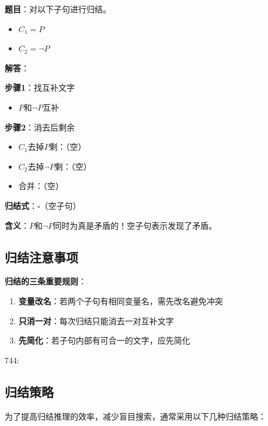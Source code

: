 \begin{examplebox}[例题3.11 归结得到空子句]
\textbf{题目}：对以下子句进行归结。
\begin{itemize}[itemsep=0pt]
    \item $C_1 = P$
    \item $C_2 = \neg P$
\end{itemize}
\tcblower
\textbf{解答}：

\textbf{步骤1}：找互补文字
\begin{itemize}[itemsep=0pt]
    \item $P$和$\neg P$互补
\end{itemize}

\textbf{步骤2}：消去后剩余
\begin{itemize}[itemsep=0pt]
    \item $C_1$去掉$P$剩：（空）
    \item $C_2$去掉$\neg P$剩：（空）
    \item 合并：（空）
\end{itemize}

\textbf{归结式}：$\square$（空子句）

\textbf{含义}：$P$和$\neg P$同时为真是矛盾的！空子句表示发现了矛盾。
\end{examplebox}

\subsection{归结注意事项}

\begin{notebox}
\textbf{归结的三条重要规则}：
\begin{enumerate}[itemsep=0pt]
    \item \textbf{变量改名}：若两个子句有相同变量名，需先改名避免冲突
    \item \textbf{只消一对}：每次归结只能消去一对互补文字
    \item \textbf{先简化}：若子句内部有可合一的文字，应先简化
\end{enumerate}
\end{notebox}


744: \subsection{归结策略}

为了提高归结推理的效率，减少盲目搜索，通常采用以下几种归结策略：

